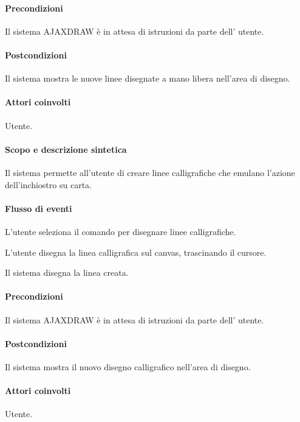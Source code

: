 \paragraph{Precondizioni} Il sistema AJAXDRAW \`e in attesa di istruzioni da parte dell' utente.
\paragraph{Postcondizioni} Il sistema mostra le nuove linee disegnate a mano libera nell'area di disegno.

\paragraph{Attori coinvolti} Utente.
\paragraph{Scopo e descrizione sintetica} 
Il sistema permette all'utente di creare linee calligrafiche che emulano l'azione dell'inchiostro su carta.
\paragraph{Flusso di eventi}
\begin{elenconumerato}[\textbf{}]{\subsubsecindent}
\item L'utente seleziona il comando per disegnare linee calligrafiche.
\item L'utente disegna la linea calligrafica sul canvas, trascinando il cursore.
\item Il sistema disegna la linea creata.
\end{elenconumerato}
\paragraph{Precondizioni} Il sistema AJAXDRAW \`e in attesa di istruzioni da parte dell' utente.
\paragraph{Postcondizioni} Il sistema mostra il nuovo disegno calligrafico nell'area di disegno.

\paragraph{Attori coinvolti} Utente.

